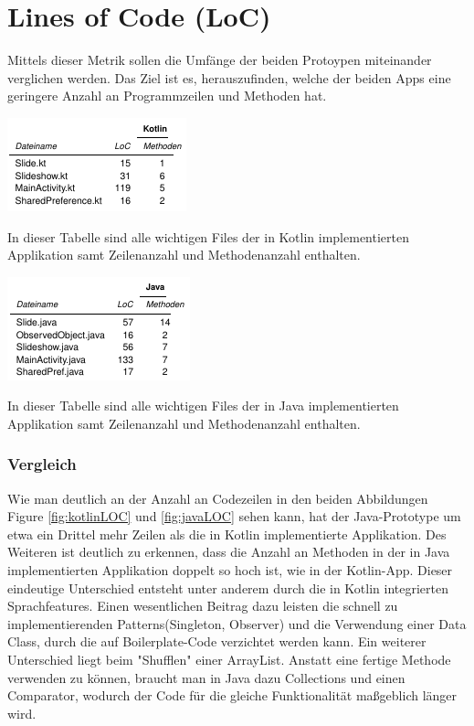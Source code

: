 \documentclass{sigchi-ext}
\begin{document}
\section{Lines of Code (LoC)}
Mittels dieser Metrik sollen die Umfänge der beiden Protoypen miteinander verglichen werden. Das Ziel ist es, herauszufinden, welche der beiden Apps eine geringere Anzahl an Programmzeilen und Methoden hat.

\begin{marginfigure}[-20pc]
  \begin{minipage}{\marginparwidth}
    \centering
    \includegraphics[width=1.05\marginparwidth]{figures/Kotlin-Tabelle.png}
    \caption{In dieser Tabelle sind alle wichtigen Files der in Kotlin implementierten Applikation samt Zeilenanzahl und Methodenanzahl enthalten.}
    \label{fig:kotlinLOC}
  \end{minipage}
\end{marginfigure}

\begin{marginfigure}[-3pc]
  \begin{minipage}{\marginparwidth}
    \centering
    \includegraphics[width=1.05\marginparwidth]{figures/Java-Tabelle.png}
    \caption{In dieser Tabelle sind alle wichtigen Files der in Java implementierten Applikation samt Zeilenanzahl und Methodenanzahl enthalten. }
    \label{fig:javaLOC}
  \end{minipage}
\end{marginfigure}

\subsubsection{Vergleich}
Wie man deutlich an der Anzahl an Codezeilen in den beiden Abbildungen Figure \ref{fig:kotlinLOC} und \ref{fig:javaLOC} sehen kann, hat der Java-Prototype um etwa ein Drittel mehr Zeilen als die in Kotlin implementierte Applikation. Des Weiteren ist deutlich zu erkennen, dass die Anzahl an Methoden in der in Java implementierten Applikation doppelt so hoch ist, wie in der Kotlin-App. Dieser eindeutige Unterschied entsteht unter anderem durch die in Kotlin integrierten Sprachfeatures. Einen wesentlichen Beitrag dazu leisten die schnell zu implementierenden Patterns(Singleton, Observer) und die Verwendung einer Data Class, durch die auf Boilerplate-Code verzichtet werden kann.
Ein weiterer Unterschied liegt beim "Shufflen" einer ArrayList. Anstatt eine fertige Methode verwenden zu können, braucht man in Java dazu Collections und einen Comparator, wodurch der Code für die gleiche Funktionalität maßgeblich länger wird.
\end{document}
